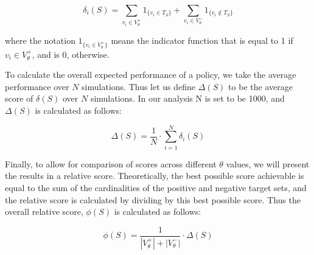 \begin{equation}
	\delta_i(S) = \sum_{v_i \in V_\theta^+} 1_{\{v_i \in T_S\}} + \sum_{v_i \in V_\theta^-} 1_{\{v_i \not \in T_S\}}
\end{equation}

where the notation $1_{\{v_i \in V_\theta^+\}}$ means the indicator function that is equal to 1 if $v_i \in V_\theta^+$, and is 0, otherwise.

To calculate the overall expected performance of a policy, we take the average performance over $N$ simulations. Thus let us define $\Delta(S)$ to be the average score of $\delta(S)$ over $N$ simulations. In our analysis N is set to be 1000, and $\Delta(S)$ is calculated as follows:

\begin{equation}
	\Delta(S) = \frac{1}{N} \cdot \sum_{i = 1}^{N} \delta_i(S)
\end{equation}

Finally, to allow for comparison of scores across different $\theta$ values, we will present the results in a relative score. Theoretically, the best possible score achievable is equal to the sum of the cardinalities of the positive and negative target sets, and the relative score is calculated by dividing by this best possible score. Thus the overall relative score, $\phi(S)$ is calculated as follows:

\begin{equation}
	\phi(S) = \frac{1}{|V^+_\theta| + |V^-_\theta|} \cdot \Delta(S)
\end{equation}
